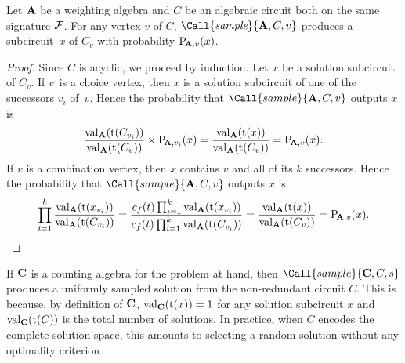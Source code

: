 \begin{theorem}
    Let \(\mathbf{A}\) be a weighting algebra and \(C\) be an algebraic circuit both on the same signature \(\mathcal{F}\).
    For any vertex \(v\) of \(C\),
    \(\Call{\emph{sample}}{\alg, C, v}\) produces a subcircuit~\(x\) of \(C_v\) with probability \(\mathrm{P}\!_{\mathbf{A},v}(x)\).
\end{theorem}
\begin{proof}
    Since \(C\) is acyclic, we proceed by induction.
    Let \(x\) be a solution subcircuit of \(C_v\).
    If \(v\)~is a choice vertex, then \(x\) is a solution subcircuit of one of the successors \(v_i\) of~\(v\).
    Hence the probability that \(\Call{sample}{\alg, C, v}\) outputs \(x\) is \[
        \frac{\operatorname{val}_{\mathbf{A}}(\operatorname{t}(C_{v_i}))}{\operatorname{val}_{\mathbf{A}}(\operatorname{t}(C_v))} \times \mathrm{P}\!_{\mathbf{A},v_i}(x)
        = \frac{\operatorname{val}_{\mathbf{A}}(\operatorname{t}(x))}{\operatorname{val}_{\mathbf{A}}(\operatorname{t}(C_v))}
        = \mathrm{P}\!_{\mathbf{A},v}(x).
    \]
    If \(v\) is a combination vertex, then \(x\) contains \(v\) and all of its \(k\) successors.
    Hence the probability that \(\Call{sample}{\alg, C, v}\) outputs \(x\) is \[
        \prod_{i=1}^k \frac{\operatorname{val}_{\mathbf{A}}(\operatorname{t}(x_{v_i}))}{\operatorname{val}_{\mathbf{A}}(\operatorname{t}(C_{v_i}))}
        = \frac{c_f(t) \prod_{i=1}^k \operatorname{val}_{\mathbf{A}}(\operatorname{t}(x_{v_i}))}
            {c_f(t) \prod_{i=1}^k \operatorname{val}_{\mathbf{A}}(\operatorname{t}(C_{v_i}))}
        = \frac{\operatorname{val}_{\mathbf{A}}(\operatorname{t}(x))}{\operatorname{val}_{\mathbf{A}}(\operatorname{t}(C_v))}
        = \mathrm{P}\!_{\mathbf{A},v}(x).
        \qedhere
    \]
\end{proof}

\begin{example}
    If \(\mathbf{C}\) is a counting algebra for the problem at hand, then \(\Call{sample}{\alcount, C, s}\) produces a uniformly sampled solution from the non-redundant circuit \(C\).
    This is because, by definition of \(\mathbf{C}\), \(\operatorname{val}_{\mathbf{C}}(\operatorname{t}(x)) = 1\) for any solution subcircuit \(x\) and \(\operatorname{val}_{\mathbf{C}}(\operatorname{t}(C))\) is the total number of solutions.
    In practice, when \(C\) encodes the complete solution space, this amounts to selecting a random solution without any optimality criterion.
\end{example}

